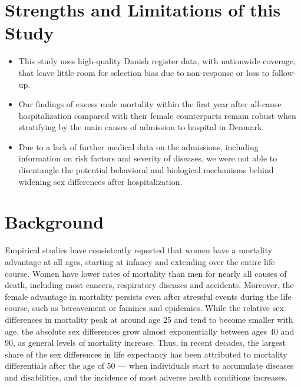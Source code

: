 \section{Strengths and Limitations of this Study}
\begin{itemize}
	\item 	This study uses high-quality Danish register data, 
			with nationwide coverage, that leave little room 
			for selection bias due to non-response or loss to 
			follow-up.
	\item 	Our findings of excess male mortality within the 
			first year after all-cause hospitalization compared 
			with their female counterparts remain robust when 
			stratifying by the main causes of admission to hospital 
			in Denmark.
	\item	Due to a lack of further medical data on the admissions, 
			including information on risk factors and severity of 
			diseases, we were not able to disentangle the potential 
			behavioral and biological mechanisms behind widening sex 
			differences after hospitalization.
\end{itemize}


\newpage

\section{Background}

Empirical studies have consistently reported that women have 
a mortality advantage at all ages, starting at infancy and 
extending over the entire life course.\citep{drevenstedt2008rise} 
Women have lower rates of mortality than men for nearly all 
causes of death, including most cancers,\citep{najari2013sex,
edgren2012,cook2011} respiratory diseases\citep{de2009sex,
dransfield2007gender} and accidents.\citep{waldron2005trends} 
Moreover, the female advantage in mortality persists even 
after stressful events during the life course, such as 
bereavement\citep{stroebe2007health,moon2011widowhood} or 
famines and epidemics.\citep{zarulli2018women} While the 
relative sex differences in mortality peak at around age 
25 and tend to become smaller with age,\citep{gjonca2005} 
the absolute sex differences grow almost exponentially 
between ages 40 and 90, as general levels of mortality 
increase.\citep{wisser2014sex} Thus, in recent decades, 
the largest share of the sex differences in life expectancy 
has been attributed to mortality differentials after the 
age of 50\citep{beltran2015} — when individuals start to 
accumulate diseases and disabilities, and the incidence of 
most adverse health conditions increases.\citep{christensen2009ageing}

